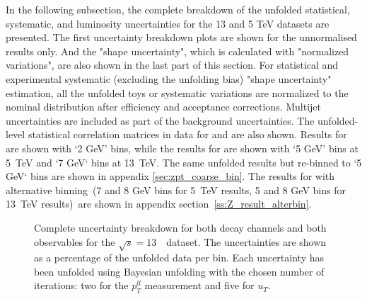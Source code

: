 In the following subsection, the complete breakdown of the unfolded statistical, systematic, and luminosity uncertainties for the 13 and 5 TeV datasets are presented. The first uncertainty breakdown plots are shown for the unnormalised results only. And the "shape uncertainty", which is calculated with "normalized variations", are also shown in the last part of this section. For statistical and experimental systematic (excluding the unfolding bias) "shape uncertainty" estimation, all the unfolded toys or systematic variations are normalized to the nominal \pt distribution after efficiency and acceptance corrections. Multijet uncertainties are included as part of the background uncertainties. The unfolded-level statistical correlation matrices in data for \ptdilep and \ut are also shown. Results for \ptdilep are shown with `2 GeV' bins, while the results for \ut are shown with `5 GeV' bins at 5~TeV and `7 GeV` bins at 13~TeV. The same \ptdilep unfolded results but re-binned to `5 GeV` bins are shown in appendix \ref{sec:zpt_coarse_bin}. The results for \ut with alternative binning~(7 and 8 GeV bins for 5~TeV results, 5 and 8 GeV bins for 13~TeV results)~are shown in appendix section~\ref{ss:Z_result_alterbin}. 


\begin{figure}[h]
\centering
{}






\caption{Complete uncertainty breakdown for both \Zboson decay channels and both observables for the $\sqrt{s} = 13$~\TeV\ dataset. The uncertainties are shown as a percentage of the unfolded data per \pT bin. Each uncertainty has been unfolded using Bayesian unfolding with the chosen number of iterations: two for the $p_{T}^{ll}$ measurement and five for $u_{T}$.}\end{figure}

